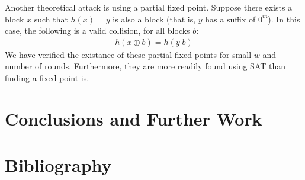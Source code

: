 \documentclass[10pt,twocolumn,twoside]{pnas-new}
\begin{document}
Another theoretical attack is using a partial fixed point. Suppose there
exists a block $x$ such that $h(x) = y$ is also a block (that is, $y$ has
a suffix of $0^{m}$). In this case, the following is a valid collision,
for all blocks $b$:
\begin{align*}
    h(x \oplus b) = h(y | b)
\end{align*}
We have verified the existance of these partial fixed points for small
$w$ and number of rounds. Furthermore, they are more readily found using SAT
than finding a fixed point is.



\section{Conclusions and Further Work} \label{sec:conclusion}


\section{Bibliography} \label{sec:bibliography}


\end{document}
